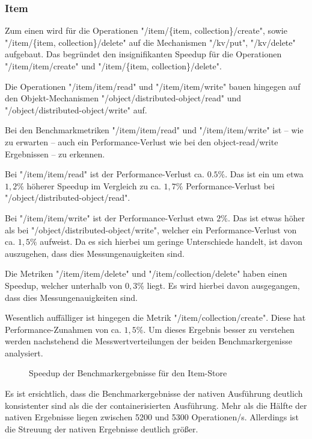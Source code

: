 \subsubsection{Item}

Zum einen wird für die Operationen "/item/\{item, collection\}/create", sowie "/item/\{item, collection\}/delete" auf die Mechanismen "/kv/put", "/kv/delete" aufgebaut. Das begründet den insignifikanten Speedup für die Operationen "/item/item/create" und "/item/\{item, collection\}/delete". 

Die Operationen "/item/item/read" und "/item/item/write" bauen hingegen auf den Objekt-Mechanismen "/object/distributed-object/read" und "/object/distributed-object/write" auf.

Bei den Benchmarkmetriken "/item/item/read" und "/item/item/write" ist – wie zu erwarten – auch ein Performance-Verlust wie bei den object-read/write Ergebnissen – zu erkennen. 

Bei "/item/item/read" ist der Performance-Verlust ca. $0.5\%$. Das ist ein um etwa $1,2\%$ höherer Speedup im Vergleich zu ca. $1,7\%$ Performance-Verlust bei "/object/distributed-object/read". 

Bei "/item/item/write" ist der Performance-Verlust etwa $2\%$. Das ist etwas höher als bei "/object/distributed-object/write", welcher ein Performance-Verlust von ca. $1,5\%$ aufweist. Da es sich hierbei um geringe Unterschiede handelt, ist davon auszugehen, dass dies Messungenauigkeiten sind. 

Die Metriken "/item/item/delete" und "/item/collection/delete" haben einen Speedup, welcher unterhalb von $0,3\%$ liegt. Es wird hierbei davon ausgegangen, dass dies Messungenauigkeiten sind.

Wesentlich auffälliger ist hingegen die Metrik "/item/collection/create". Diese hat Performance-Zunahmen von ca. $1,5\%$. Um dieses Ergebnis besser zu verstehen werden nachstehend die Messwertverteilungen der beiden Benchmarkergenisse analysiert. 

\begin{figure}[H]
    \centering
    
    \caption{Speedup der Benchmarkergebnisse für den Item-Store}
    \label{fig:speedup_item_collection_create}
\end{figure}

\FloatBarrier

Es ist ersichtlich, dass die Benchmarkergebnisse der nativen Ausführung deutlich konsistenter sind als die der containerisierten Ausführung. Mehr als die Hälfte der nativen Ergebnisse liegen zwischen 5200 und 5300 Operationen/s. Allerdings ist die Streuung der nativen Ergebnisse deutlich größer. 

